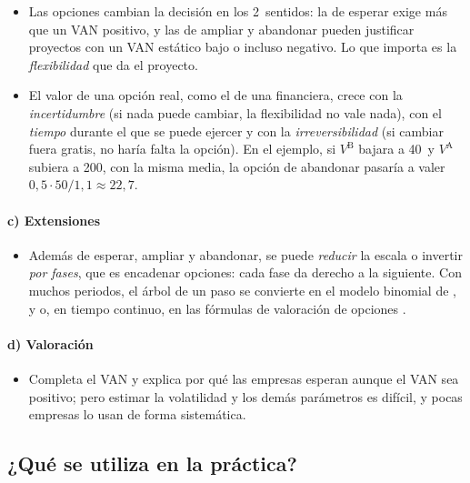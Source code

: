 \documentclass[11pt]{article}
\begin{document}
\begin{itemize}
\item Las opciones cambian la decisión en los 2~sentidos: la de esperar exige más que un VAN positivo, y las de ampliar y abandonar pueden justificar proyectos con un VAN estático bajo o incluso negativo. Lo que importa es la \emph{flexibilidad} que da el proyecto.
\item El valor de una opción real, como el de una financiera\nocite{BlackScholes1973Pricing}, crece con la \emph{incertidumbre} (si nada puede cambiar, la flexibilidad no vale nada), con el \emph{tiempo} durante el que se puede ejercer y con la \emph{irreversibilidad} (si cambiar fuera gratis, no haría falta la opción). En el ejemplo, si $V^{\mathrm B}$ bajara a 40~y $V^{\mathrm A}$ subiera a 200, con la misma media, la opción de abandonar pasaría a valer $0{,}5\cdot50/1{,}1\approx22{,}7$.
\end{itemize}

\paragraph{c) Extensiones}

\begin{itemize}
\item Además de esperar, ampliar y abandonar, se puede \emph{reducir} la escala o invertir \emph{por fases}, que es encadenar opciones: cada fase da derecho a la siguiente. Con muchos periodos, el árbol de un paso se convierte en el modelo binomial de ,  y  o, en tiempo continuo, en las fórmulas de valoración de opciones .
\end{itemize}

\paragraph{d) Valoración}

\begin{itemize}
\item Completa el VAN y explica por qué las empresas esperan aunque el VAN sea positivo; pero estimar la volatilidad y los demás parámetros es difícil, y pocas empresas lo usan de forma sistemática\nocite{GrahamHarvey2001Theory}.
\end{itemize}

\subsection{¿Qué se utiliza en la práctica?}\label{sec:practica}
\end{document}
